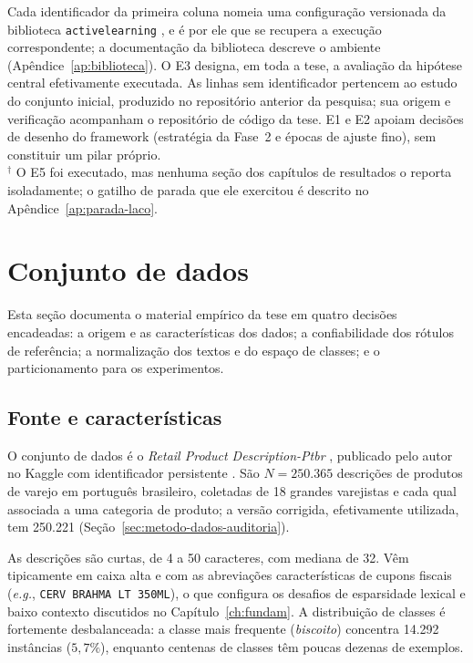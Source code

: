 \begin{table}[htb]
\vspace{0.4em}
{\footnotesize Cada identificador da primeira coluna nomeia uma configuração
versionada da biblioteca \texttt{activelearning} \cite{DaruActiveLearning}, e é
por ele que se recupera a execução correspondente; a
documentação da biblioteca descreve o ambiente (Apêndice~\ref{ap:biblioteca}). O E3 designa,
em toda a tese, a avaliação da hipótese central efetivamente executada. As linhas sem
identificador pertencem ao estudo do conjunto inicial, produzido no
repositório anterior da pesquisa; sua origem e verificação acompanham o
repositório de código da tese. E1 e E2 apoiam decisões de desenho
do framework (estratégia da Fase~2 e épocas de ajuste fino), sem constituir
um pilar próprio.\\[2pt]
$^{\dagger}$ O E5 foi executado, mas nenhuma seção dos capítulos de resultados o
reporta isoladamente; o gatilho de parada que ele exercitou é descrito no
Apêndice~\ref{ap:parada-laco}.}
\end{table}

\section{Conjunto de dados}
\label{sec:metodo-dados}

Esta seção documenta o material empírico da tese em quatro decisões
encadeadas: a origem e as características dos dados; a confiabilidade dos
rótulos de referência; a normalização dos textos e do espaço de classes; e
o particionamento para os experimentos.

\subsection{Fonte e características}
\label{sec:metodo-dados-fonte}

O conjunto de dados é o \textit{Retail Product Description-Ptbr}
\citep{Daru2022,Daru2024Dissertacao}, publicado pelo autor no Kaggle com
identificador persistente \citep[DOI 10.34740/kaggle/dsv/4265348;][]{Daru2022Dataset}.
São $N=250.365$ descrições de produtos de varejo em português brasileiro,
coletadas de 18 grandes varejistas e cada qual associada a uma categoria de
produto; a versão corrigida, efetivamente utilizada, tem 250.221
(Seção~\ref{sec:metodo-dados-auditoria}).

As descrições são curtas, de 4 a 50 caracteres, com mediana de 32. Vêm
tipicamente em caixa alta e com as abreviações características de cupons fiscais
(\textit{e.g.}, \texttt{CERV BRAHMA LT 350ML}), o que configura os desafios de
esparsidade lexical e baixo contexto discutidos no Capítulo~\ref{ch:fundam}. A
distribuição de classes é fortemente desbalanceada: a classe mais frequente
(\textit{biscoito}) concentra 14.292 instâncias ($5{,}7\%$), enquanto centenas de
classes têm poucas dezenas de exemplos.

